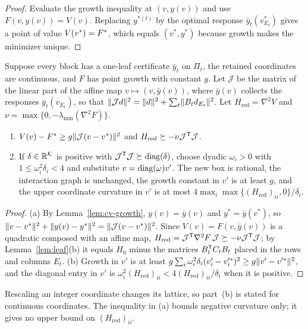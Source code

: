 \begin{proof}
Evaluate the growth inequality at $(v,y(v))$ and use $F(v,y(v))=V(v)$.
Replacing $y^{*(t)}$ by the optimal response $\bar y_t(v^*_{E_t})$ gives a
point of value $V(v^*)=F^{*}$, which equals $(v^*,y^*)$ because growth makes
the minimizer unique.
\end{proof}

\begin{corollary}\label{cor:cv-affine}
Suppose every block has a one-leaf certificate $\bar y_t$ on $\Pi_t$, the
retained coordinates are continuous, and $F$ has point growth with
constant $g$. Let $\mathcal J$ be the matrix of the linear part of the affine
map $v\mapsto(v,\bar y(v))$, where $\bar y(v)$ collects the responses
$\bar y_t(v_{E_t})$, so that
$\lVert \mathcal Jd\rVert^2=\lVert d\rVert^2+\sum_t\lVert B_td_{E_t}\rVert^2$. Let
$H_{\mathrm{red}}=\nabla^2V$ and $\nu=\max\{0,-\lambda_{\min}(\nabla^2F)\}$.
\begin{enumerate}
\item[(a)] $V(v)-F^{*}\ge g\lVert \mathcal J(v-v^*)\rVert^2$ and
$H_{\mathrm{red}}\succeq-\nu\mathcal J^{\mathsf T}\mathcal J$.
\item[(b)] If $\delta\in\mathbb R^{\mathcal K}$ is positive with
$\mathcal J^{\mathsf T}\mathcal J\succeq\operatorname{diag}(\delta)$, choose dyadic $\omega_i>0$
with $1\le\omega_i^2\delta_i<4$ and substitute $v=\operatorname{diag}(\omega)v'$. The new
box is rational, the interaction graph is unchanged, the growth constant in
$v'$ is at least $g$, and the upper coordinate curvature in $v'$ is at most
$4\max_i\max\{(H_{\mathrm{red}})_{ii},0\}/\delta_i$.
\end{enumerate}
\end{corollary}

\begin{proof}
(a) By Lemma~\ref{lem:cv-growth}, $y(v)=\bar y(v)$ and $y^*=\bar y(v^*)$,
so $\lVert v-v^*\rVert^2+\lVert y(v)-y^*\rVert^2=\lVert \mathcal J(v-v^*)\rVert^2$. Since
$V(v)=F(v,\bar y(v))$ is a quadratic composed with an affine map,
$H_{\mathrm{red}}=\mathcal J^{\mathsf T}\nabla^2F\,\mathcal J\succeq-\nu\mathcal J^{\mathsf T}\mathcal J$;
by Lemma~\ref{lem:leaf}(b) it equals $H_0$ minus the matrices
$B_t^{\mathsf T}C_tB_t$ placed in the rows and columns $E_t$. (b) Growth in $v'$
is at least $g\sum_i\omega_i^2\delta_i(v'_i-v'^*_i)^2\ge g\lVert v'-v'^*\rVert^2$,
and the diagonal entry in $v'$ is
$\omega_i^2(H_{\mathrm{red}})_{ii}<4(H_{\mathrm{red}})_{ii}/\delta_i$ when it
is positive.
\end{proof}

Rescaling an integer coordinate changes its lattice, so part~(b) is stated
for continuous coordinates. The inequality in (a) bounds negative curvature
only; it gives no upper bound on $(H_{\mathrm{red}})_{ii}$.

